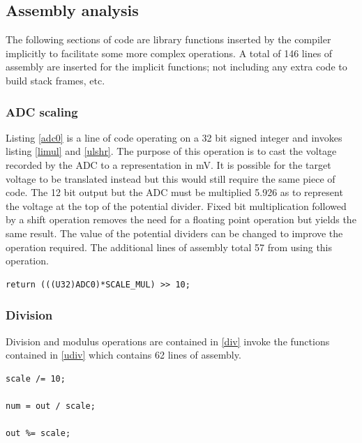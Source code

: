 \documentclass[12pt]{article}%
\begin{document}
\subsection{Assembly analysis}

The following sections of code are library functions inserted by the compiler implicitly to facilitate some more complex operations. A total of 146 lines of assembly are inserted for the implicit functions; not including any extra code to build stack frames, etc.

\subsubsection{ADC scaling}

Listing \ref{adc0} is a line of code operating on a 32 bit signed integer and invokes listing \ref{limul} and \ref{ulshr}. The purpose of this operation is to cast the voltage recorded by the ADC to a representation in mV. It is possible for the target voltage to be translated instead but this would still require the same piece of code. The 12 bit output but the ADC must be multiplied 5.926 as to represent the voltage at the top of the potential divider. Fixed bit multiplication followed by a shift operation removes the need for a floating point operation but yields the same result. The value of the potential dividers can be changed to improve the operation required. The additional lines of assembly total 57 from using this operation.

\begin{lstlisting}
return (((U32)ADC0)*SCALE_MUL) >> 10;
\end{lstlisting}







\subsubsection{Division}

Division and modulus operations are contained in \ref{div} invoke the functions contained in \ref{udiv} which contains 62 lines of assembly. 

\begin{lstlisting}
scale /= 10;

num = out / scale;

out %= scale;	
\end{lstlisting}
\end{document}
